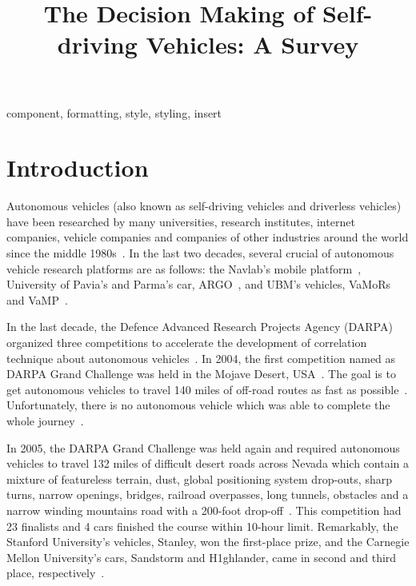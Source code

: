 \documentclass[conference]{IEEEtran}
\begin{document}
\title{The Decision Making of Self-driving Vehicles: A Survey}

\author{


}

\maketitle

\begin{abstract}

\end{abstract}

\begin{IEEEkeywords}
component, formatting, style, styling, insert
\end{IEEEkeywords}

\section{Introduction}
Autonomous vehicles (also known as self-driving vehicles and driverless vehicles) have been researched by many universities, research institutes, internet companies, vehicle companies and companies of other industries around the world since the middle 1980s~\cite{self_driving}. In the last two decades, several crucial of autonomous vehicle research platforms are as follows: the Navlab's mobile platform~\cite{Thorpe199144}, University of Pavia's and Parma's car, ARGO~\cite{Broggi199955}, and UBM's vehicles, VaMoRs and VaMP~\cite{Gregor200248}.

In the last decade, the Defence Advanced Research Projects Agency (DARPA) organized three competitions to accelerate the development of correlation technique about autonomous vehicles~\cite{Brian2016}. In 2004, the first competition named as DARPA Grand Challenge was held in the Mojave Desert, USA~\cite{self_driving}. The goal is to get autonomous vehicles to travel 140 miles of off-road routes as fast as possible~\cite{Brian2016}. Unfortunately, there is no autonomous vehicle which was able to complete the whole journey~\cite{self_driving}.

In 2005, the DARPA Grand Challenge was held again and required autonomous vehicles to travel 132 miles of difficult desert roads across Nevada which contain a mixture of featureless terrain, dust, global positioning system drop-outs, sharp turns, narrow openings, bridges, railroad overpasses, long tunnels, obstacles and a narrow winding mountains road with a 200-foot drop-off~\cite{Buehler2007}. This competition had 23 finalists and 4 cars finished the course within 10-hour limit. Remarkably, the Stanford University's vehicles, Stanley, won the first-place prize, and the Carnegie Mellon University's cars, Sandstorm and H1ghlander, came in second and third place, respectively~\cite{Buehler2007}.
\end{document}
